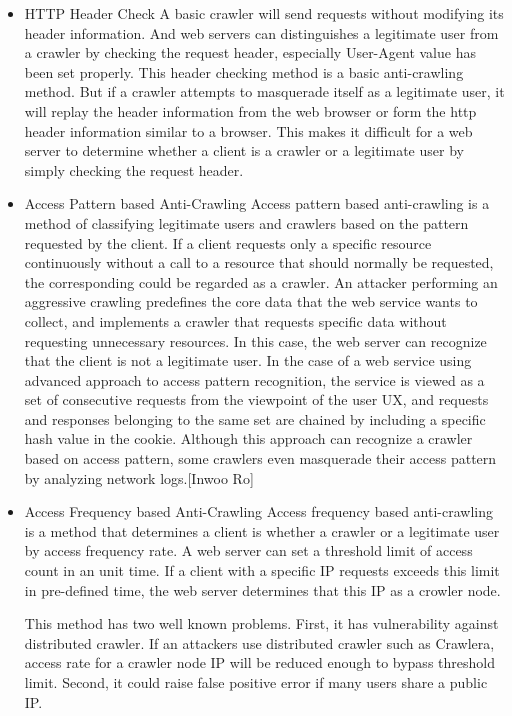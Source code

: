 \documentclass[sigconf,anonymous=true]{acmart}
\begin{document}
\begin{itemize}
\item HTTP Header Check\newline
A basic crawler will send requests without modifying its header information. And web servers can distinguishes a legitimate user from a crawler by checking the request header, especially User-Agent value has been set properly. This header checking method is a basic anti-crawling method.
But if a crawler attempts to masquerade itself as a legitimate user, it will replay the header information from the web browser or form the http header information similar to a browser. This makes it difficult for a web server to determine whether a client is a crawler or a legitimate user by simply checking the request header.

\item Access Pattern based Anti-Crawling\newline
Access pattern based anti-crawling is a method of classifying legitimate users and crawlers based on the pattern requested by the client. If a client requests only a specific resource continuously without a call to a resource that should normally be requested, the corresponding could be regarded as a crawler. 
An attacker performing an aggressive crawling predefines the core data that the web service wants to collect, and implements a crawler that requests specific data without requesting unnecessary resources. In this case, the web server can recognize that the client is not a legitimate user.
In the case of a web service using advanced approach to access pattern recognition, the service is viewed as a set of consecutive requests from the viewpoint of the user UX, and requests and responses belonging to the same set are chained by including a specific hash value in the cookie.
Although this approach can recognize a crawler based on access pattern, some crawlers even masquerade their access pattern by analyzing network logs.[Inwoo Ro] 

\item Access Frequency based Anti-Crawling\newline
Access frequency based anti-crawling is a method that determines a client is whether a crawler or a legitimate user by access frequency rate. A web server can set a threshold limit of access count in an unit time. If a client with a specific IP requests exceeds this limit in pre-defined time, the web server determines that this IP as a crowler node.

This method has two well known problems. 
First, it has vulnerability against distributed crawler. If an attackers use distributed crawler such as Crawlera, access rate for a crawler node IP will be reduced enough to bypass threshold limit.
Second, it could raise false positive error if many users share a public IP.
\end{itemize}
\end{document}
